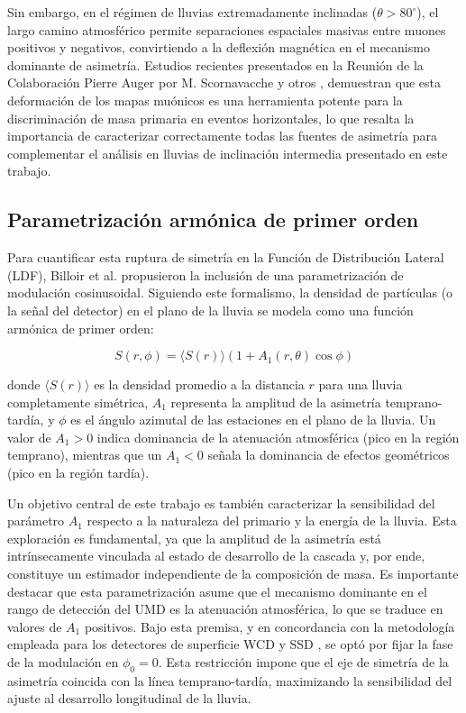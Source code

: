 Sin embargo, en el régimen de lluvias extremadamente inclinadas ($\theta > 80^\circ$), el largo camino atmosférico permite separaciones espaciales masivas entre muones positivos y negativos, convirtiendo a la deflexión magnética en el mecanismo dominante de asimetría. Estudios recientes presentados en la Reunión de la Colaboración Pierre Auger por M. Scornavacche \cite{Scornavacche2026} y otros \cite{collaboration_2014}, demuestran que esta deformación de los mapas muónicos es una herramienta potente para la discriminación de masa primaria en eventos horizontales, lo que resalta la importancia de caracterizar correctamente todas las fuentes de asimetría para complementar el análisis en lluvias de inclinación intermedia presentado en este trabajo.

\subsection{Parametrización armónica de primer orden}
\label{subsec:parametrizacion}

Para cuantificar esta ruptura de simetría en la Función de Distribución Lateral (LDF), Billoir et al. \cite{Billoir2002} propusieron la inclusión de una parametrización de modulación cosinusoidal. Siguiendo este formalismo, la densidad de partículas (o la señal del detector) en el plano de la lluvia se modela como una función armónica de primer orden:

\begin{equation}
	S(r,\phi) = \langle S(r) \rangle \left( 1 + A_1(r, \theta) \cos\phi \right)
	\label{eq:asimetria_a1}
\end{equation}

donde $\langle S(r) \rangle$ es la densidad promedio a la distancia $r$ para una lluvia completamente simétrica, $A_1$ representa la amplitud de la asimetría temprano-tardía, y $\phi$ es el ángulo azimutal de las estaciones en el plano de la lluvia. Un valor de $A_1 > 0$ indica dominancia de la atenuación atmosférica (pico en la región temprano), mientras que un $A_1 < 0$ señala la dominancia de efectos geométricos (pico en la región tardía).

Un objetivo central de este trabajo es también caracterizar la sensibilidad del parámetro $A_1$ respecto a la naturaleza del primario y la energía de la lluvia. Esta exploración es fundamental, ya que la amplitud de la asimetría está intrínsecamente vinculada al estado de desarrollo de la cascada y, por ende, constituye un estimador independiente de la composición de masa. Es importante destacar que esta parametrización asume que el mecanismo dominante en el rango de detección del UMD es la atenuación atmosférica, lo que se traduce en valores de $A_1$ positivos. Bajo esta premisa, y en concordancia con la metodología empleada para los detectores de superficie WCD y SSD \cite{BradfieldThesis}, se optó por fijar la fase de la modulación en $\phi_0 = 0$. Esta restricción impone que el eje de simetría de la asimetría coincida con la línea temprano-tardía, maximizando la sensibilidad del ajuste al desarrollo longitudinal de la lluvia.

